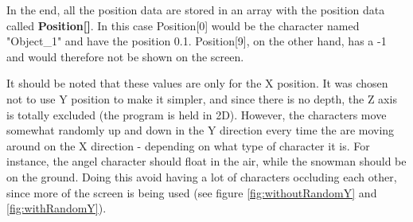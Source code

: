 In the end, all the position data are stored in an array with the position data called \textbf{Position[]}. In this case Position[0] would be the character named "Object\_1" and have the position 0.1. Position[9], on the other hand, has a -1 and would therefore not be shown on the screen.

It should be noted that these values are only for the X position. It was chosen not to use Y position to make it simpler, and since there is no depth, the Z axis is totally excluded (the program is held in 2D). However, the characters move somewhat randomly up and down in the Y direction every time the are moving around on the X direction - depending on what type of character it is. For instance, the angel character should float in the air, while the snowman should be on the ground. Doing this avoid having a lot of characters occluding each other, since more of the screen is being used (see figure \ref{fig:withoutRandomY} and \ref{fig:withRandomY}).

